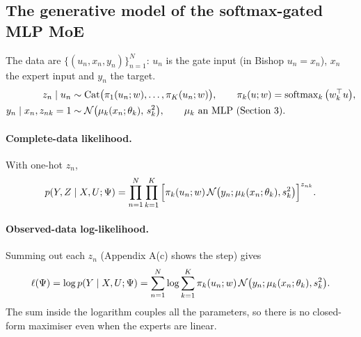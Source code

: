 \subsection{The generative model of the softmax-gated MLP MoE}

The data are $\{(u_n,x_n,y_n)\}_{n=1}^N$: $u_n$ is the gate input (in Bishop $u_n=x_n$), $x_n$ the expert input and $y_n$ the target.
\begin{align}
z_n\mid u_n&\sim\text{Cat}\big(\pi_1(u_n;w),\dots,\pi_K(u_n;w)\big),\qquad \pi_k(u;w)=\operatorname{softmax}_k\big(w_k^{\top} u\big),\\
y_n\mid x_n,z_{nk}=1&\sim\mathcal{N}\big(\mu_k(x_n;\theta_k),\,s_k^2\big),\qquad \mu_k\text{ an MLP (Section 3)}.
\end{align}

\begin{center}
\end{center}

\paragraph{Complete-data likelihood.} With one-hot $z_n$,
\begin{equation}
p(Y,Z\mid X,U;\Psi)=\prod_{n=1}^N\prod_{k=1}^K\Big[\pi_k(u_n;w)\,\mathcal{N}\big(y_n;\mu_k(x_n;\theta_k),s_k^2\big)\Big]^{z_{nk}}.
\end{equation}
\paragraph{Observed-data log-likelihood.} Summing out each $z_n$ (Appendix A(c) shows the step) gives
\begin{equation}\label{eq:softmax-ll}
\ell(\Psi)=\log p(Y\mid X,U;\Psi)=\sum_{n=1}^N\log\sum_{k=1}^K\pi_k(u_n;w)\,\mathcal{N}\big(y_n;\mu_k(x_n;\theta_k),s_k^2\big).
\end{equation}
The sum inside the logarithm couples all the parameters, so there is no closed-form maximiser even when the experts are linear.

